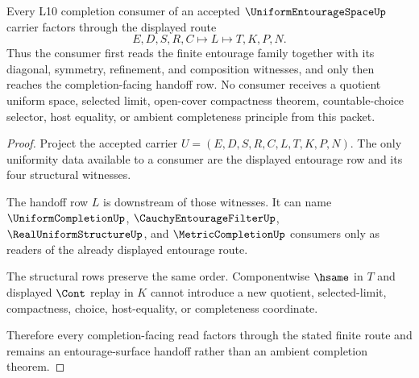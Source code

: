 \begin{theorem}
\label{thm:uniform-entourage-space-completion-handoff}
Every L10 completion consumer of an accepted $\UniformEntourageSpaceUp$ carrier factors through the displayed route
$$
E,D,S,R,C \longmapsto L \longmapsto T,K,P,N .
$$
Thus the consumer first reads the finite entourage family together with its diagonal, symmetry, refinement, and composition witnesses, and only then reaches the completion-facing handoff row. No consumer receives a quotient uniform space, selected limit, open-cover compactness theorem, countable-choice selector, host equality, or ambient completeness principle from this packet.
\end{theorem}
\begin{proof}
Project the accepted carrier $U=(E,D,S,R,C,L,T,K,P,N)$. The only uniformity data available to a consumer are the displayed entourage row and its four structural witnesses.

The handoff row $L$ is downstream of those witnesses. It can name $\UniformCompletionUp$, $\CauchyEntourageFilterUp$, $\RealUniformStructureUp$, and $\MetricCompletionUp$ consumers only as readers of the already displayed entourage route.

The structural rows preserve the same order. Componentwise $\hsame$ in $T$ and displayed $\Cont$ replay in $K$ cannot introduce a new quotient, selected-limit, compactness, choice, host-equality, or completeness coordinate.

Therefore every completion-facing read factors through the stated finite route and remains an entourage-surface handoff rather than an ambient completion theorem.
\end{proof}


\begin{closurestatus}{\UniformEntourageSpaceUp}
  \theoryclosure{\seedClosure}
  \formalstatus{\unformalizedV}
\end{closurestatus}
